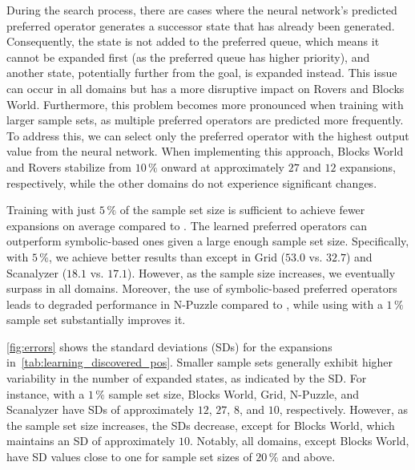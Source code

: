 \documentclass[ppgc,diss,english]{iiufrgs}
\begin{document}
During the search process, there are cases where the neural network's predicted preferred operator generates a successor state that has already been generated. Consequently, the state is not added to the preferred queue, which means it cannot be expanded first (as the preferred queue has higher priority), and another state, potentially further from the goal, is expanded instead. This issue can occur in all domains but has a more disruptive impact on Rovers and Blocks World. Furthermore, this problem becomes more pronounced when training with larger sample sets, as multiple preferred operators are predicted more frequently. To address this, we can select only the preferred operator with the highest output value from the neural network. When implementing this approach, Blocks World and Rovers stabilize from $10\,\%$ onward at approximately $27$ and $12$ expansions, respectively, while the other domains do not experience significant changes. %

Training with just $5\,\%$ of the sample set size is sufficient to achieve fewer expansions on average compared to \poff. The learned preferred operators \pog can outperform symbolic-based ones given a large enough sample set size. Specifically, with $5\,\%$, we achieve better results than \poff except in Grid ($53.0$ vs. $32.7$) and Scanalyzer ($18.1$ vs. $17.1$). However, as the sample size increases, we eventually surpass \poff in all domains. Moreover, the use of symbolic-based preferred operators \poff leads to degraded performance in N-Puzzle compared to \hnn, while using \pog with a $1\,\%$ sample set substantially improves it.

\cref{fig:errors} shows the standard deviations (SDs) for the expansions in~\cref{tab:learning_discovered_pos}. Smaller sample sets generally exhibit higher variability in the number of expanded states, as indicated by the SD. For instance, with a $1\,\%$ sample set size, Blocks World, Grid, N-Puzzle, and Scanalyzer have SDs of approximately $12$, $27$, $8$, and $10$, respectively. However, as the sample set size increases, the SDs decrease, except for Blocks World, which maintains an SD of approximately $10$. Notably, all domains, except Blocks World, have SD values close to one for sample set sizes of $20\,\%$ and above.
\end{document}
